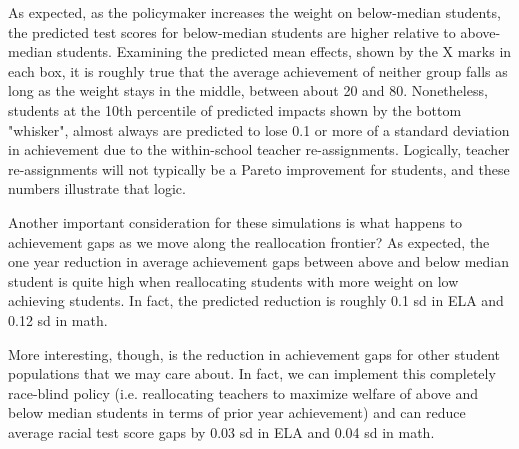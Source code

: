 \documentclass[12pt]{article}
\theoremstyle{definition}
\theoremstyle{definition}
\theoremstyle{definition}
\theoremstyle{definition}
\begin{document}
As expected, as the policymaker increases the weight on below-median students, the predicted test scores for below-median students are higher relative to above-median students. Examining the predicted mean effects, shown by the X marks in each box, it is roughly true that the average achievement of neither group falls as long as the weight stays in the middle, between about 20 and 80. Nonetheless, students at the 10th percentile of predicted impacts shown by the bottom "whisker", almost always are predicted to lose 0.1 or more of a standard deviation in achievement due to the within-school teacher re-assignments. Logically, teacher re-assignments will not typically be a Pareto improvement for students, and these numbers illustrate that logic.

Another important consideration for these simulations is what happens to achievement gaps as we move along the reallocation frontier? As expected, the one year reduction in average achievement gaps between above and below median student is quite high when reallocating students with more weight on low achieving students. In fact, the predicted reduction is roughly 0.1 sd in ELA and 0.12 sd in math.

	More interesting, though, is the reduction in achievement gaps for other student populations that we may care about. In fact, we can implement this completely race-blind policy (i.e. reallocating teachers to maximize welfare of above and below median students in terms of prior year achievement) and can reduce average racial test score gaps by 0.03 sd in ELA and 0.04 sd in math. 
 
\end{document}
